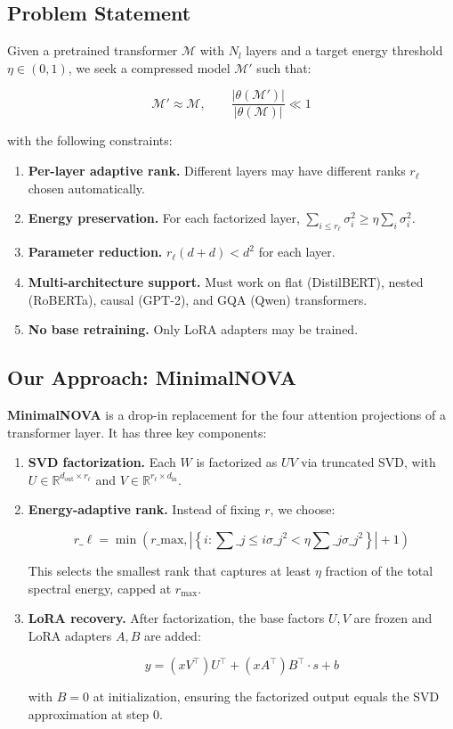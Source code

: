 \subsection{Problem Statement}

Given a pretrained transformer $\mathcal{M}$ with $N_l$ layers and a target 
energy threshold $\eta \in (0, 1)$, we seek a compressed model $\mathcal{M}'$ 
such that:

\[
\mathcal{M}' \approx \mathcal{M}, \qquad
\frac{|\theta(\mathcal{M}')|}{|\theta(\mathcal{M})|} \ll 1
\tag{1.3}
\]

with the following constraints:

\begin{enumerate}
\item \textbf{Per-layer adaptive rank.} Different layers may have different ranks
  $r_\ell$ chosen automatically.
\item \textbf{Energy preservation.} For each factorized layer,
  $\sum_{i \leq r_\ell} \sigma_i^2 \geq \eta \sum_i \sigma_i^2$.
\item \textbf{Parameter reduction.} $r_\ell (d + d) < d^2$ for each layer.
\item \textbf{Multi-architecture support.} Must work on flat (DistilBERT), nested
  (RoBERTa), causal (GPT-2), and GQA (Qwen) transformers.
\item \textbf{No base retraining.} Only LoRA adapters may be trained.

\end{enumerate}
\subsection{Our Approach: MinimalNOVA}

\textbf{MinimalNOVA} is a drop-in replacement for the four attention projections 
of a transformer layer. It has three key components:

\begin{enumerate}
\item \textbf{SVD factorization.} Each $W$ is factorized as $U V$ via truncated SVD,
  with $U \in \mathbb{R}^{d_\text{out} \times r_\ell}$ and
  $V \in \mathbb{R}^{r_\ell \times d_\text{in}}$.

\item \textbf{Energy-adaptive rank.} Instead of fixing $r$, we choose:

  $$
  r\_\ell = \min\!\left(r\_\text{max}, \left|\left\{i : \sum\_{j \leq i} \sigma\_j^2 < \eta \sum\_j \sigma\_j^2\right\}\right| + 1\right)
  \tag{1.4}
  $$

  This selects the smallest rank that captures at least $\eta$ fraction of
  the total spectral energy, capped at $r_\text{max}$.

\item \textbf{LoRA recovery.} After factorization, the base factors $U, V$ are
  frozen and LoRA adapters $A, B$ are added:

  $$
  y = (x V^\top) U^\top + (x A^\top) B^\top \cdot s + b
  \tag{1.5}
  $$

  with $B = 0$ at initialization, ensuring the factorized output equals
  the SVD approximation at step 0.

\end{enumerate}
